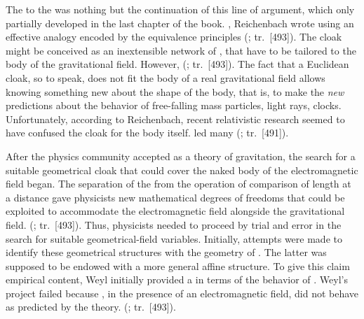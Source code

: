\documentclass[draft]{article}
\newcommand{\PRZL}{\citetitle{Reichenbach1928}\xspace}
\renewcommand{\rzlap}[2]{(\cite[#1]{Reichenbach1928}; tr.\ [#2])\xspace}
\begin{document}
The \Ap to the \PRZL was nothing but the continuation of this line of argument, which only partially developed in the last chapter of the book. , Reichenbach wrote using an effective analogy  encoded by the equivalence principles  \rzlap{354}{493}. The cloak might be conceived as an inextensible network of \rac, that have to be tailored to the body of the gravitational field. However,  \rzlap{354}{493}. The fact that a Euclidean cloak, so to speak, does not fit the body of a real gravitational field allows knowing something new about the shape of the body, that is, to make the \emph{new} predictions about the behavior of free-falling mass particles, light rays, clocks\etc. Unfortunately, according to Reichenbach, recent relativistic research seemed to have confused the cloak for the body itself.  led many  \rzlap{352}{491}. 

After the physics community accepted \gr as a theory of gravitation, the search for a suitable geometrical cloak that could cover the naked body of the electromagnetic field began. The separation of the  \Gtmn from the operation of comparison of length at a distance \gmn gave physicists new mathematical degrees of freedoms that could be exploited to accommodate the electromagnetic field alongside the gravitational field.  \rzlap{354}{493}. Thus, physicists needed to proceed by trial and error in the search for suitable geometrical-field variables. Initially, attempts were made to identify these geometrical structures with  the geometry of \spti. The latter was supposed to be endowed with a more general affine structure. To give this claim empirical content, Weyl initially provided a  in terms of the behavior of \rac. Weyl's project failed because \rac, in the presence of an electromagnetic field, did not behave as predicted by the theory.  \rzlap{353}{493}.
\end{document}
